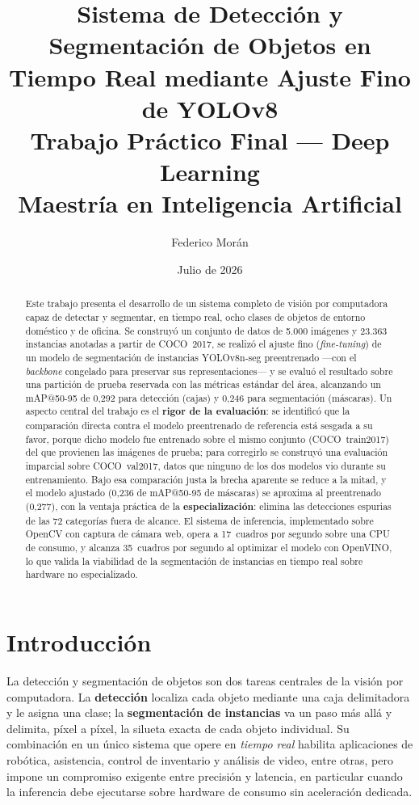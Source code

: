 \documentclass[11pt,a4paper]{article}
\title{\textbf{Sistema de Detección y Segmentación de Objetos en Tiempo Real
mediante Ajuste Fino de YOLOv8}\\[1ex]
\large Trabajo Práctico Final --- Deep Learning\\
Maestría en Inteligencia Artificial}
\author{Federico Morán}
\date{Julio de 2026}
\begin{document}
\maketitle

\begin{abstract}
\noindent
Este trabajo presenta el desarrollo de un sistema completo de visión por
computadora capaz de detectar y segmentar, en tiempo real, ocho clases de
objetos de entorno doméstico y de oficina. Se construyó un conjunto de datos de
5.000 imágenes y 23.363 instancias anotadas a partir de COCO~2017, se realizó
el ajuste fino (\emph{fine-tuning}) de un modelo de segmentación de instancias
YOLOv8n-seg preentrenado ---con el \emph{backbone} congelado para preservar sus
representaciones--- y se evaluó el resultado sobre una partición de prueba
reservada con las métricas estándar del área, alcanzando un mAP@50-95 de 0,292
para detección (cajas) y 0,246 para segmentación (máscaras). Un aspecto central
del trabajo es el \textbf{rigor de la evaluación}: se identificó que la
comparación directa contra el modelo preentrenado de referencia está sesgada a
su favor, porque dicho modelo fue entrenado sobre el mismo conjunto
(COCO~train2017) del que provienen las imágenes de prueba; para corregirlo se
construyó una evaluación imparcial sobre COCO~val2017, datos que ninguno de los
dos modelos vio durante su entrenamiento. Bajo esa comparación justa la brecha
aparente se reduce a la mitad, y el modelo ajustado (0,236 de mAP@50-95 de
máscaras) se aproxima al preentrenado (0,277), con la ventaja práctica de la
\textbf{especialización}: elimina las detecciones espurias de las 72 categorías
fuera de alcance. El sistema de inferencia, implementado sobre OpenCV con
captura de cámara web, opera a 17~cuadros por segundo sobre una CPU de
consumo, y alcanza 35~cuadros por segundo al optimizar el modelo con OpenVINO,
lo que valida la viabilidad de la segmentación de instancias en tiempo real
sobre hardware no especializado.
\end{abstract}

\section{Introducción}

La detección y segmentación de objetos son dos tareas centrales de la visión
por computadora. La \textbf{detección} localiza cada objeto mediante una caja
delimitadora y le asigna una clase; la \textbf{segmentación de instancias} va
un paso más allá y delimita, píxel a píxel, la silueta exacta de cada objeto
individual. Su combinación en un único sistema que opere en \emph{tiempo real}
habilita aplicaciones de robótica, asistencia, control de inventario y
análisis de video, entre otras, pero impone un compromiso exigente entre
precisión y latencia, en particular cuando la inferencia debe ejecutarse sobre
hardware de consumo sin aceleración dedicada.
\end{document}
